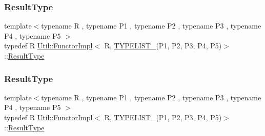 \mbox{\label{classUtil_1_1FunctorImpl_3_01R_00_01TYPELIST__5_07P1_00_01P2_00_01P3_00_01P4_00_01P5_08_4_ad1b291756f0f94ecde300b4a2ea9ce14}} 
\subsubsection{\texorpdfstring{ResultType}{ResultType}\hspace{0.1cm}{\footnotesize\ttfamily [2/3]}}
{\footnotesize\ttfamily template$<$typename R , typename P1 , typename P2 , typename P3 , typename P4 , typename P5 $>$ \\
typedef R \mbox{\hyperlink{classUtil_1_1FunctorImpl}{Util\+::\+Functor\+Impl}}$<$ R, \mbox{\hyperlink{adat__devel__install_2include_2adat_2typelist_8h_aad5d9b3c82c8503c85c625acd41c0a2f}{T\+Y\+P\+E\+L\+I\+S\+T\+\_}}(P1, P2, P3, P4, P5)$>$\+::\mbox{\hyperlink{structUtil_1_1Private_1_1FunctorImplBase_a5e95fd30fdd89f3c5080b68ab5891bc3}{Result\+Type}}}

\mbox{\label{classUtil_1_1FunctorImpl_3_01R_00_01TYPELIST__5_07P1_00_01P2_00_01P3_00_01P4_00_01P5_08_4_ad1b291756f0f94ecde300b4a2ea9ce14}} 
\subsubsection{\texorpdfstring{ResultType}{ResultType}\hspace{0.1cm}{\footnotesize\ttfamily [3/3]}}
{\footnotesize\ttfamily template$<$typename R , typename P1 , typename P2 , typename P3 , typename P4 , typename P5 $>$ \\
typedef R \mbox{\hyperlink{classUtil_1_1FunctorImpl}{Util\+::\+Functor\+Impl}}$<$ R, \mbox{\hyperlink{adat__devel__install_2include_2adat_2typelist_8h_aad5d9b3c82c8503c85c625acd41c0a2f}{T\+Y\+P\+E\+L\+I\+S\+T\+\_}}(P1, P2, P3, P4, P5)$>$\+::\mbox{\hyperlink{structUtil_1_1Private_1_1FunctorImplBase_a5e95fd30fdd89f3c5080b68ab5891bc3}{Result\+Type}}}



